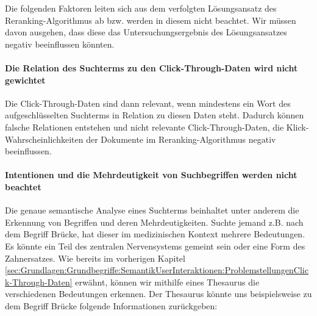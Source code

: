 Die folgenden Faktoren leiten sich aus dem verfolgten Lösungsansatz des Reranking-Algorithmus ab bzw. werden in diesem nicht beachtet. Wir müssen davon ausgehen, dass diese das Untersuchungsergebnis des Lösungsansatzes negativ beeinflussen könnten.

\paragraph{Die Relation des Suchterms zu den Click-Through-Daten wird nicht gewichtet}
Die Click-Through-Daten sind dann relevant, wenn mindestens ein Wort des aufgeschlüsselten Suchterms in Relation zu diesen Daten steht. Dadurch können falsche Relationen entstehen und nicht relevante Click-Through-Daten, die Klick-Wahrscheinlichkeiten der Dokumente im Reranking-Algorithmus negativ beeinflussen.

\paragraph{Intentionen und die Mehrdeutigkeit von Suchbegriffen werden nicht beachtet}
Die genaue semantische Analyse eines Suchterms beinhaltet unter anderem die Erkennung von Begriffen und deren Mehrdeutigkeiten. Suchte jemand z.B. nach dem Begriff \glqq Brücke\grqq{}, hat dieser im medizinischen Kontext mehrere Bedeutungen. Es könnte \glqq ein Teil des zentralen Nervensystems\grqq{} gemeint sein oder \glqq eine Form des Zahnersatzes\grqq{}. Wie bereits im vorherigen Kapitel \ref{sec:Grundlagen:Grundbegriffe:SemantikUserInteraktionen:ProblemstellungenClick-Through-Daten} erwähnt, können wir mithilfe eines Thesaurus die verschiedenen Bedeutungen erkennen. Der Thesaurus könnte uns beispielsweise zu dem Begriff \glqq Brücke\grqq{} folgende Informationen zurückgeben:

